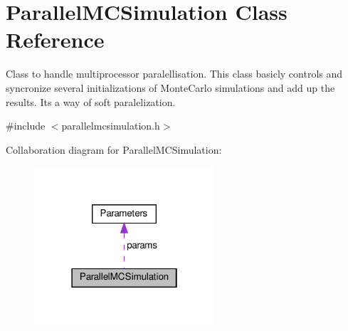 \hypertarget{class_parallel_m_c_simulation}{}\section{Parallel\+M\+C\+Simulation Class Reference}
\label{class_parallel_m_c_simulation}


Class to handle multiprocessor paralellisation. This class basicly controls and syncronize several initializations of Monte\+Carlo simulations and add up the results. It\textquotesingle{}s a way of soft paralelization.  




{\ttfamily \#include $<$parallelmcsimulation.\+h$>$}



Collaboration diagram for Parallel\+M\+C\+Simulation\+:\nopagebreak
\begin{figure}[H]
\begin{center}
\leavevmode
\includegraphics[width=190pt]{class_parallel_m_c_simulation__coll__graph}
\end{center}
\end{figure}
